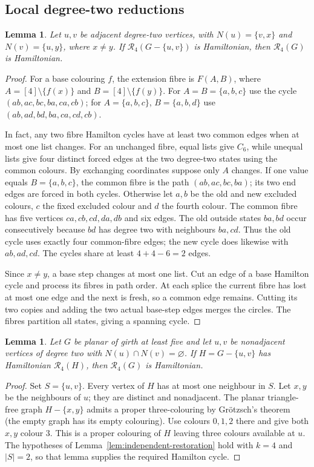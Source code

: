 \documentclass[11pt]{article}
\newtheorem{lemma}[theorem]{Lemma}
\theoremstyle{remark}
\newcommand{\R}{\mathcal R}
\numberwithin{equation}{section}
\numberwithin{table}{section}
\begin{document}
\subsection{Local degree-two reductions}
\begin{lemma}
\label{lem:adjacent-two-four}
Let $u,v$ be adjacent degree-two vertices, with
$N(u)=\{v,x\}$ and $N(v)=\{u,y\}$, where $x\ne y$.  If
$\R_4(G-\{u,v\})$ is Hamiltonian, then $\R_4(G)$ is Hamiltonian.
\end{lemma}
\begin{proof}
For a base colouring $f$, the extension fibre is $F(A,B)$, where
$A=[4]\setminus\{f(x)\}$ and $B=[4]\setminus\{f(y)\}$.
For $A=B=\{a,b,c\}$ use the cycle $(ab,ac,bc,ba,ca,cb)$;
for $A=\{a,b,c\}$, $B=\{a,b,d\}$ use
$(ab,ad,bd,ba,ca,cd,cb)$.

In fact, any two fibre Hamilton cycles have at least two common
edges when at most one list changes. For an unchanged fibre, equal
lists give $C_6$, while unequal lists give four distinct forced
edges at the two degree-two states using the common colours.
By exchanging coordinates suppose only $A$ changes. If one value
equals $B=\{a,b,c\}$, the common fibre is the path
$(ab,ac,bc,ba)$; its two end edges are forced in both cycles.
Otherwise let $a,b$ be the old and new excluded colours, $c$ the
fixed excluded colour and $d$ the fourth colour. The common fibre
has five vertices $ca,cb,cd,da,db$ and six edges. The old outside
states $ba,bd$ occur consecutively because $bd$ has degree two
with neighbours $ba,cd$. Thus the old cycle uses exactly four
common-fibre edges; the new cycle does likewise with $ab,ad,cd$.
The cycles share at least $4+4-6=2$ edges.

Since $x\ne y$, a base step changes at most one list. Cut an edge
of a base Hamilton cycle and process its fibres in path order.
At each splice the current fibre has lost at most one edge and the
next is fresh, so a common edge remains. Cutting its two copies
and adding the two actual base-step edges merges the circles.
The fibres partition all states, giving a spanning cycle.
\end{proof}

\begin{lemma}\label{lem:separated-two-g5}
Let $G$ be planar of girth at least five and let $u,v$ be nonadjacent
vertices of degree two with $N(u)\cap N(v)=\varnothing$.  If
$H=G-\{u,v\}$ has Hamiltonian $\R_4(H)$, then $\R_4(G)$ is Hamiltonian.
\end{lemma}
\begin{proof}
Set $S=\{u,v\}$.  Every vertex of $H$ has at most one neighbour in $S$.
Let $x,y$ be the neighbours of $u$; they are distinct and nonadjacent.
The planar triangle-free graph $H-\{x,y\}$ admits a proper three-colouring
by Gr\"otzsch's theorem~\cite{Grotzsch59} (the empty graph has its empty
colouring).  Use colours $0,1,2$ there and give both $x,y$ colour $3$.
This is a proper colouring of $H$ leaving three colours available at $u$.
The hypotheses of Lemma~\ref{lem:independent-restoration} hold with
$k=4$ and $|S|=2$, so that lemma supplies the required Hamilton cycle.
\end{proof}
\end{document}

